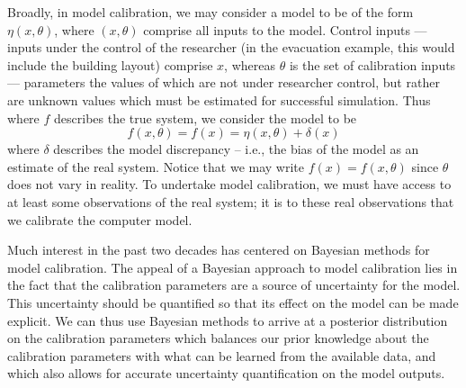 \documentclass{article}
\begin{document}
Broadly, in model calibration, we may consider a model to be of the form $\eta(x,\theta)$, where $(x,\theta)$ comprise all inputs to the model. Control inputs --- inputs under the control of the researcher (in the evacuation example, this would include the building layout) comprise $x$, whereas $\theta$ is the set of calibration inputs --- parameters the values of which are not under researcher control, but rather are unknown values which must be estimated for successful simulation. Thus where $f$ describes the true system, we consider the model to be 
\begin{equation} \label{eq:1}
f(x,\theta)=f(x)=\eta(x,\theta) + \delta(x)
\end{equation} 
where $\delta$ describes the model discrepancy -- i.e., the bias of the model as an estimate of the real system. Notice that we may write $f(x)=f(x,\theta)$ since $\theta$ does not vary in reality. To undertake model calibration, we must have access to at least some observations of the real system; it is to these real observations that we calibrate the computer model.

Much interest in the past two decades has centered on Bayesian methods for model calibration. The appeal of a Bayesian approach to model calibration lies in the fact that the calibration parameters are a source of uncertainty for the model. This uncertainty should be quantified so that its effect on the model can be made explicit. We can thus use Bayesian methods to arrive at a posterior distribution on the calibration parameters which balances our prior knowledge about the calibration parameters with what can be learned from the available data, and which also allows for accurate uncertainty quantification on the model outputs. 
\end{document}
